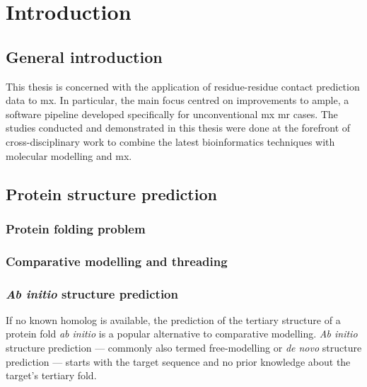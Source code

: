 \section{Introduction}
\subsection{General introduction}
This thesis is concerned with the application of residue-residue contact prediction data to \gls{mx}. In particular, the main focus centred on improvements to \gls{ample}, a software pipeline developed specifically for unconventional \gls{mx} \gls{mr} cases. The studies conducted and demonstrated in this thesis were done at the forefront of cross-disciplinary work to combine the latest bioinformatics techniques with molecular modelling and \gls{mx}.


\subsection{Protein structure prediction}
\subsubsection{Protein folding problem}
\subsubsection{Comparative modelling and threading}
\subsubsection{\textit{Ab initio} structure prediction}
If no known homolog is available, the prediction of the tertiary structure of a protein fold \textit{ab initio} is a popular alternative to comparative modelling. \textit{Ab initio} structure prediction --- commonly also termed free-modelling or \textit{de novo} structure prediction --- starts with the target sequence and no prior knowledge about the target's tertiary fold. 

